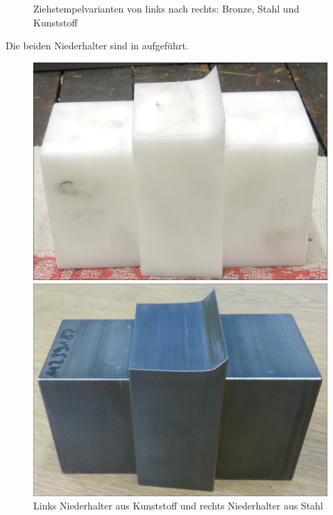 \documentclass[12pt,a4paper,parskip,twoside,BCOR5mm,headsepline]{scrartcl}
\begin{document}
\begin{description*}
\begin{figure}[H]
\begin{minipage} [t]{0.329\textwidth}
\end{minipage}
\caption{Ziehstempelvarianten von links nach rechts: Bronze, Stahl und Kunststoff}
\label{fig:punchvar}
\end{figure}

Die beiden Niederhalter sind in aufgeführt.





\begin{figure}[H]
\centering
\begin{minipage}[t]{0.45\textwidth}
\includegraphics[width=.93\textwidth]{niederhalterkunst}
\end{minipage}
\begin{minipage}[t]{0.45\textwidth}
\includegraphics[width=.95\textwidth]{niederhalterS}
\end{minipage}
\caption{ Links Niederhalter aus Kunststoff und rechts Niederhalter aus Stahl}
\label{fig:nied}
\end{figure}
\newpage

\end{description*}
\end{document}
